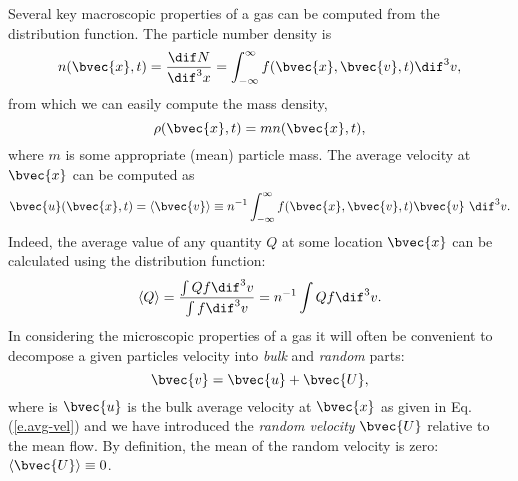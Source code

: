 Several key macroscopic properties of a gas can be computed from the distribution function. The particle number density is
\begin{equation}
  n(\bvec{x},t) = \frac{\dif N}{\dif^3x} = \int_{-\infty}^\infty f(\bvec{x},\bvec{v},t) \dif^3 v,
\end{equation}
from which we can easily compute the mass density,
\begin{equation}
  \rho(\bvec{x},t) = m n(\bvec{x},t), \label{e.mass-density}
\end{equation}
where $m$ is some appropriate (mean) particle mass.
The average velocity at $\bvec{x}$ can be computed as
\begin{equation}
  \bvec{u}(\bvec{x},t) = \langle \bvec{v} \rangle \equiv n^{-1} \int_{-\infty}^{\infty} f(\bvec{x},\bvec{v},t)\bvec{v}\ \dif^3 v.\label{e.avg-vel}
\end{equation}
Indeed, the average value of any quantity $Q$ at some location $\bvec{x}$ can be calculated using the distribution function:
\begin{equation}
  \langle Q \rangle = \frac{\int Q f \dif^3 v}{\int f \dif^3v} = n^{-1} \int Qf\dif^3v.\label{e.averages}
\end{equation}
In considering the microscopic properties of a gas it will often be convenient to decompose a given particles velocity into {\it bulk} and {\it random} parts:
\begin{equation}
  \bvec{v} = \bvec{u} + \bvec{U}, \label{e.vel-decomp}
\end{equation}
where is $\bvec{u}$ is the bulk average velocity at $\bvec{x}$ as given in Eq. (\ref{e.avg-vel}) and we have introduced the {\it random velocity} $\bvec{U}$ relative to the mean flow.
By definition, the mean of the random velocity is zero: $\langle\bvec{U}\rangle \equiv 0$.

